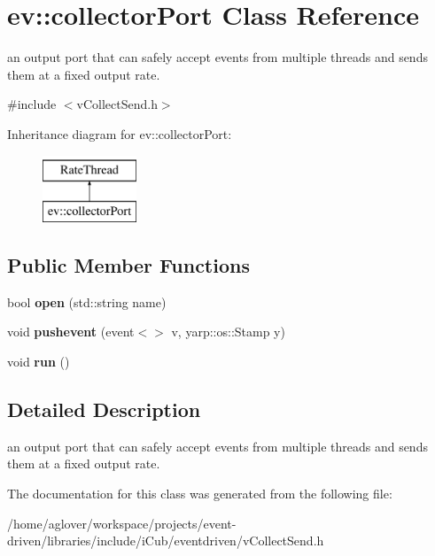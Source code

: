 \hypertarget{classev_1_1collectorPort}{}\section{ev\+:\+:collector\+Port Class Reference}
\label{classev_1_1collectorPort}


an output port that can safely accept events from multiple threads and sends them at a fixed output rate.  




{\ttfamily \#include $<$v\+Collect\+Send.\+h$>$}

Inheritance diagram for ev\+:\+:collector\+Port\+:\begin{figure}[H]
\begin{center}
\leavevmode
\includegraphics[height=2.000000cm]{classev_1_1collectorPort}
\end{center}
\end{figure}
\subsection*{Public Member Functions}
\begin{DoxyCompactItemize}
\item 
bool {\bfseries open} (std\+::string name)\hypertarget{classev_1_1collectorPort_a164072ae38c4e115873c451984b8e7f4}{}\label{classev_1_1collectorPort_a164072ae38c4e115873c451984b8e7f4}

\item 
void {\bfseries pushevent} (event$<$$>$ v, yarp\+::os\+::\+Stamp y)\hypertarget{classev_1_1collectorPort_ab1d587f6b728b65b22df73bbe674607d}{}\label{classev_1_1collectorPort_ab1d587f6b728b65b22df73bbe674607d}

\item 
void {\bfseries run} ()\hypertarget{classev_1_1collectorPort_a7ec227ae78ec71ca8867a20ae815ea7d}{}\label{classev_1_1collectorPort_a7ec227ae78ec71ca8867a20ae815ea7d}

\end{DoxyCompactItemize}


\subsection{Detailed Description}
an output port that can safely accept events from multiple threads and sends them at a fixed output rate. 

The documentation for this class was generated from the following file\+:\begin{DoxyCompactItemize}
\item 
/home/aglover/workspace/projects/event-\/driven/libraries/include/i\+Cub/eventdriven/v\+Collect\+Send.\+h\end{DoxyCompactItemize}
